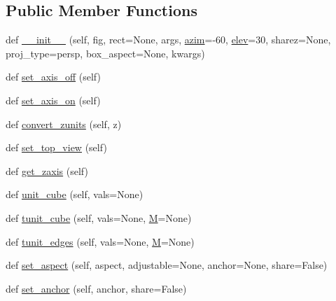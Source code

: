 \subsection*{Public Member Functions}
\begin{DoxyCompactItemize}
\item 
def \hyperlink{classmplot3d_1_1axes3d_1_1Axes3D_a2bbe5a51eea0ab294188e8aa8005fa2e}{\+\_\+\+\_\+init\+\_\+\+\_\+} (self, fig, rect=None, args, \hyperlink{classmplot3d_1_1axes3d_1_1Axes3D_af9329eb594554894e36578f08fc5bd1c}{azim}=-\/60, \hyperlink{classmplot3d_1_1axes3d_1_1Axes3D_ac4c7a5f33145517f85154fcba5f4410f}{elev}=30, sharez=None, proj\+\_\+type=\textquotesingle{}persp\textquotesingle{}, box\+\_\+aspect=None, kwargs)
\item 
def \hyperlink{classmplot3d_1_1axes3d_1_1Axes3D_aed3dd385841706b16ff06be13d84de1c}{set\+\_\+axis\+\_\+off} (self)
\item 
def \hyperlink{classmplot3d_1_1axes3d_1_1Axes3D_a6f81b42955736275f914b7712d293274}{set\+\_\+axis\+\_\+on} (self)
\item 
def \hyperlink{classmplot3d_1_1axes3d_1_1Axes3D_abed013a980faf0473d375c5239a2487d}{convert\+\_\+zunits} (self, z)
\item 
def \hyperlink{classmplot3d_1_1axes3d_1_1Axes3D_acaf7b50ada77ed82a1b502377b058ca9}{set\+\_\+top\+\_\+view} (self)
\item 
def \hyperlink{classmplot3d_1_1axes3d_1_1Axes3D_a871c220dd1082daf542f8bd17b9db1f8}{get\+\_\+zaxis} (self)
\item 
def \hyperlink{classmplot3d_1_1axes3d_1_1Axes3D_a793483aca5f85ad38c70f7475d9ccd57}{unit\+\_\+cube} (self, vals=None)
\item 
def \hyperlink{classmplot3d_1_1axes3d_1_1Axes3D_a6fc1d3eca7a87762c96241f7694eb364}{tunit\+\_\+cube} (self, vals=None, \hyperlink{classmplot3d_1_1axes3d_1_1Axes3D_ab9a6d6d85b56c3d3dfd4677b30293340}{M}=None)
\item 
def \hyperlink{classmplot3d_1_1axes3d_1_1Axes3D_a1497786d5b20b9f8dc0f7afef5e80118}{tunit\+\_\+edges} (self, vals=None, \hyperlink{classmplot3d_1_1axes3d_1_1Axes3D_ab9a6d6d85b56c3d3dfd4677b30293340}{M}=None)
\item 
def \hyperlink{classmplot3d_1_1axes3d_1_1Axes3D_a8d33058c90a4dee42389a44ef6c3b34a}{set\+\_\+aspect} (self, aspect, adjustable=None, anchor=None, share=False)
\item 
def \hyperlink{classmplot3d_1_1axes3d_1_1Axes3D_a944f0cd51817cb9a9fc264c324b68212}{set\+\_\+anchor} (self, anchor, share=False)
\item 

\end{DoxyCompactItemize}
